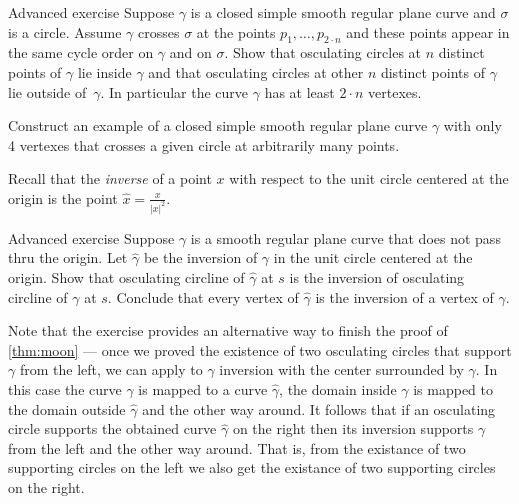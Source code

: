 \begin{thm}{Advanced exercise}\label{ex:curve-crosses-circle}
Suppose $\gamma$ is a closed simple smooth regular plane curve and $\sigma$ is a circle.
Assume $\gamma$ crosses $\sigma$ at the points $p_1,\dots,p_{2{\cdot} n}$ and these points appear in the same cycle order on $\gamma$ and on $\sigma$.
Show that osculating circles at $n$ distinct points of $\gamma$ lie inside $\gamma$ and that osculating circles at other $n$ distinct points of $\gamma$ lie outside of~$\gamma$.
In particular the curve $\gamma$ has at least $2\cdot n$ vertexes.

Construct an example of a closed simple smooth regular plane curve $\gamma$ with only 4 vertexes that crosses a given circle at arbitrarily many points. 
\end{thm}

Recall that the \emph{inverse} of a point $x$ with respect to the unit circle centered at the origin is the point $\hat x=\tfrac{x}{|x|^2}$.


\begin{thm}{Advanced exercise}\label{ex:inverse}
Suppose $\gamma$ is a smooth regular plane curve that does not pass thru the origin.
Let $\hat \gamma$ be the inversion of $\gamma$ in the unit circle centered at the origin.
Show that osculating circline of $\hat\gamma$ at $s$ is the inversion of osculating circline of $\gamma$ at $s$.
Conclude that every vertex of $\hat\gamma$ is the inversion of a vertex of $\gamma$.
\end{thm}


Note that the exercise provides an alternative way to finish the proof of \ref{thm:moon} --- once we proved the existence of two osculating circles that support $\gamma$ from the left,
we can apply to $\gamma$ inversion with the center surrounded by $\gamma$.
In this case the curve $\gamma$ is mapped to a curve $\hat \gamma$,
the domain inside $\gamma$ is mapped to the domain outside $\hat\gamma$ and the other way around.
It follows that if an osculating circle supports the obtained curve $\hat\gamma$ on the right 
then its inversion supports  $\gamma$ from the left and the other way around.
That is, from the existance of two supporting circles on the left we also get the existance of two supporting circles on the right.


